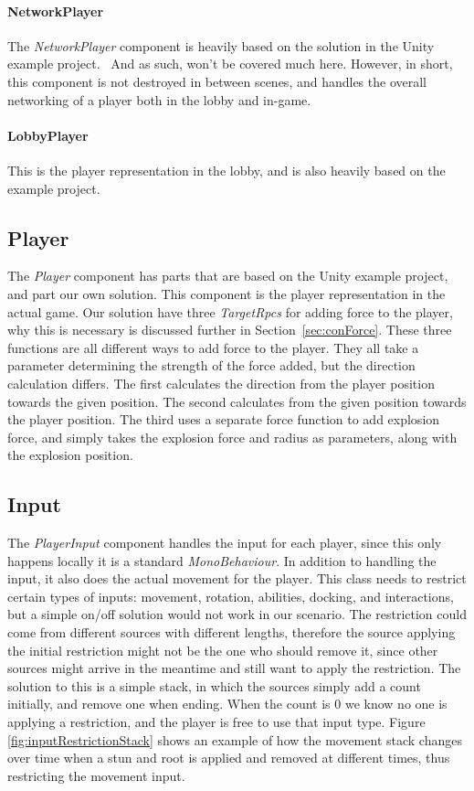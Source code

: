 \paragraph{NetworkPlayer}
The \emph{NetworkPlayer} component is heavily based on the solution in the Unity example project.~\cite{unityTanksProject} And as such, won't be covered much here. However, in short, this component is not destroyed in between scenes, and handles the overall networking of a player both in the lobby and in-game.
\paragraph{LobbyPlayer}
This is the player representation in the lobby, and is also heavily based on the example project.

\subsection{Player}
The \emph{Player} component has parts that are based on the Unity example project, and part our own solution. This component is the player representation in the actual game. Our solution have three \emph{TargetRpcs} for adding force to the player, why this is necessary is discussed further in Section~\ref{sec:conForce}. These three functions are all different ways to add force to the player. They all take a parameter determining the strength of the force added, but the direction calculation differs. The first calculates the direction from the player position towards the given position. The second calculates from the given position towards the player position. The third uses a separate force function to add explosion force, and simply takes the explosion force and radius as parameters, along with the explosion position.
    
\subsection{Input}
The \emph{PlayerInput} component handles the input for each player, since this only happens locally it is a standard \emph{MonoBehaviour}. In addition to handling the input, it also does the actual movement for the player. This class needs to restrict certain types of inputs: movement, rotation, abilities, docking, and interactions, but a simple on/off solution would not work in our scenario. The restriction could come from different sources with different lengths, therefore the source applying the initial restriction might not be the one who should remove it, since other sources might arrive in the meantime and still want to apply the restriction. The solution to this is a simple stack, in which the sources simply add a count initially, and remove one when ending. When the count is 0 we know no one is applying a restriction, and the player is free to use that input type. Figure \ref{fig:inputRestrictionStack} shows an example of how the movement stack changes over time when a stun and root is applied and removed at different times, thus restricting the movement input.

